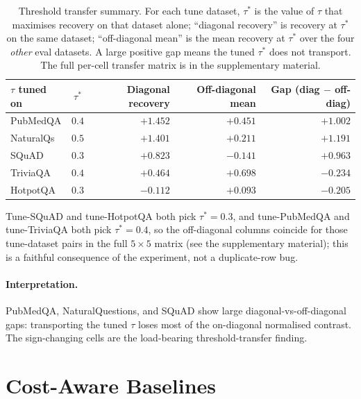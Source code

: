 \begin{table}[!htb]
\centering
\caption{Threshold transfer summary. For each tune dataset, $\tau^\ast$
is the value of $\tau$ that maximises recovery on that dataset alone;
``diagonal recovery'' is recovery at $\tau^\ast$ on the same dataset;
``off-diagonal mean'' is the mean recovery at $\tau^\ast$ over the four
\emph{other} eval datasets. A large positive gap means the tuned
$\tau^\ast$ does not transport. The full per-cell transfer matrix is
in the supplementary material.}
\label{tab:threshold_transfer_main}
\footnotesize
\begin{tabular}{lcrrr}
\toprule
$\tau$ tuned on & $\tau^\ast$ & Diagonal recovery & Off-diagonal mean & Gap (diag $-$ off-diag) \\
\midrule
PubMedQA  & $0.4$ & $+1.452$ & $+0.451$ & $+1.002$ \\
NaturalQs & $0.5$ & $+1.401$ & $+0.211$ & $+1.191$ \\
SQuAD     & $0.3$ & $+0.823$ & $-0.141$ & $+0.963$ \\
TriviaQA  & $0.4$ & $+0.464$ & $+0.698$ & $-0.234$ \\
HotpotQA  & $0.3$ & $-0.112$ & $+0.093$ & $-0.205$ \\
\bottomrule
\end{tabular}
\end{table}

Tune-SQuAD and tune-HotpotQA both pick $\tau^\ast = 0.3$, and
tune-PubMedQA and tune-TriviaQA both pick $\tau^\ast = 0.4$, so the
off-diagonal columns coincide for those tune-dataset pairs in the
full $5{\times}5$ matrix (see the supplementary material); this is a faithful
consequence of the experiment, not a duplicate-row bug.

\paragraph{Interpretation.} PubMedQA, NaturalQuestions, and SQuAD
show large diagonal-vs-off-diagonal gaps: transporting the tuned
$\tau$ loses most of the on-diagonal normalised contrast. The
sign-changing cells are the load-bearing threshold-transfer finding.


\section{Cost-Aware Baselines}
\label{sec:cost}

